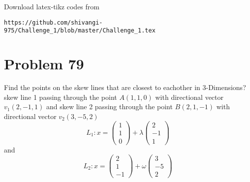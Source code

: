 \documentclass[journal,12pt,twocolumn]{IEEEtran}
\begin{document}
Download latex-tikz codes from 
%
\begin{lstlisting}
https://github.com/shivangi-975/Challenge_1/blob/master/Challenge_1.tex
\end{lstlisting}
%
\section{Problem 79}
Find the points on the skew lines that are closest to eachother in 3-Dimensions?
 skew line 1 passing through the point \(A(1,1,0)\) with directional vector \(v_1(2,-1,1)\) and skew line 2 passing through the point \(B(2,1,-1)\)  with directional vector \(v_2(3,-5,2)\)
%
%
\begin{equation}
	L_1 : x = 
\begin{pmatrix}
	1 \\
	1 \\
	0
\end{pmatrix}
	+ \lambda
\begin{pmatrix}
	2 \\
	-1 \\
	1
\end{pmatrix}
	\label{eq1}
\end{equation}
and
\begin{equation}
	L_2 : x = 
\begin{pmatrix}
	2\\
	1 \\
	-1
\end{pmatrix}
	+ \omega
\begin{pmatrix}
	3 \\
	-5 \\
	2
\end{pmatrix}
	\label{eq2}
\end{equation}
\end{document}
